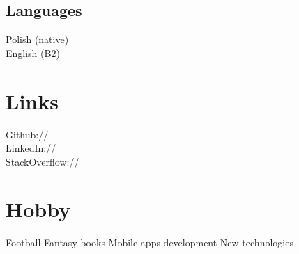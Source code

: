 \documentclass[]{deedy-resume-openfont}
\begin{document}
\begin{minipage}[t]{0.33\textwidth}
\subsection{Languages}
Polish (native) \\
English (B2)
\sectionsep


\section{Links} 
Github:// \href{https://github.com/emlagowski}{} \\
LinkedIn://  \href{https://www.linkedin.com/in/marcinlagowski}{} \\
StackOverflow://  \href{http://stackoverflow.com/users/3233685/marcin-lagowski}{} 
\sectionsep


\section{Hobby}
Football \textbullet{}   
Fantasy books \textbullet{} 
Mobile apps development \textbullet{} 
New technologies \\

%
%

\end{minipage} 
\hfill
\end{document}
